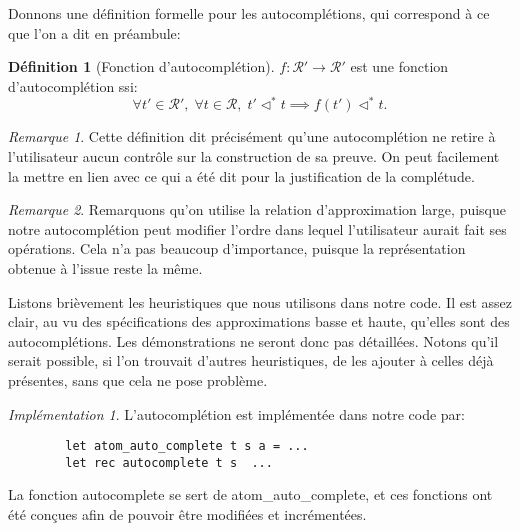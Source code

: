 \documentclass[11pt,a4paper]{article}
\theoremstyle{plain}
\theoremstyle{definition}
\newtheorem{definition}{Définition}
\theoremstyle{remark}
\newtheorem{remark}{Remarque}
\newtheorem{implementation}{Implémentation}
\newcommand*{\representations}{\ensuremath{\mathcal{R}}}
\newcommand*{\representationspartial}{\ensuremath{\mathcal{R'}}}
\newcommand*{\relapprox}{\ensuremath{\triangleleft}}
\newcommand*{\relapproxlarge}{\ensuremath{\relapprox^*}}
\begin{document}
Donnons une définition formelle pour les autocomplétions, qui correspond à ce que l'on a dit en préambule:

\begin{definition}[Fonction d'autocomplétion]
$f: \representationspartial \rightarrow \representationspartial$ est une fonction d'autocomplétion ssi:
\begin{equation*}
    \forall t' \in \representationspartial, \; \forall t \in \representations, \; t' \relapproxlarge t \implies f(t') \relapproxlarge t.
\end{equation*}
\end{definition}

\begin{remark}
    Cette définition dit précisément qu'une autocomplétion ne retire à l'utilisateur aucun contrôle sur la construction de sa preuve. On peut facilement la mettre en lien avec ce qui a été dit pour la justification de la complétude. 
\end{remark}

\begin{remark}
    Remarquons qu'on utilise la relation d'approximation large, puisque notre autocomplétion peut modifier l'ordre dans lequel l'utilisateur aurait fait ses opérations. Cela n'a pas beaucoup d'importance, puisque la représentation obtenue à l'issue reste la même.
\end{remark}

Listons brièvement les heuristiques que nous utilisons dans notre code. Il est assez clair, au vu des spécifications des approximations basse et haute, qu'elles sont des autocomplétions. Les démonstrations ne seront donc pas détaillées. Notons qu'il serait possible, si l'on trouvait d'autres heuristiques, de les ajouter à celles déjà présentes, sans que cela ne pose problème.

\begin{implementation}
    L'autocomplétion est implémentée dans notre code par:

    \begin{verbatim}
        let atom_auto_complete t s a = ...
        let rec autocomplete t s  ...
    \end{verbatim}
    
    La fonction autocomplete se sert de atom\_auto\_complete, et ces fonctions ont été conçues afin de pouvoir être modifiées et incrémentées.
\end{implementation}
\end{document}
